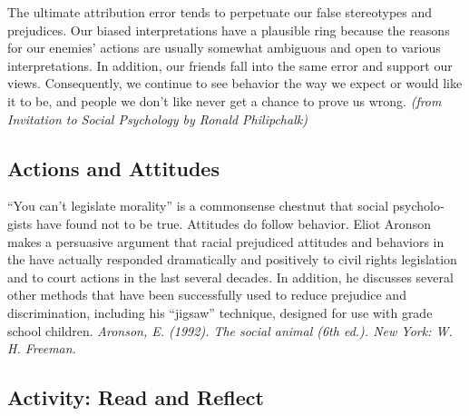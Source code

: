 \documentclass[
]{book}
\begin{document}
The ultimate attribution error tends to perpetuate our false stereotypes and prejudices. Our biased interpretations have a plausible ring because the reasons for our enemies' actions are usually somewhat ambiguous and open to various interpretations. In addition, our friends fall into the same error and support our views. Consequently, we continue to see behavior the way we expect or would like it to be, and people we don't like never get a chance to prove us wrong. \emph{(from Invitation to Social Psychology by Ronald Philipchalk)}

\hypertarget{actions-and-attitudes}{%
\subsection*{Actions and Attitudes}\label{actions-and-attitudes}}

``You can't legislate morality'' is a commonsense chestnut that social psycholo­gists have found not to be true. Attitudes do follow behavior. Eliot Aronson makes a persuasive argument that racial prejudiced attitudes and behaviors in the have actually responded dramatically and positively to civil rights legisla­tion and to court actions in the last several decades. In addition, he discusses sev­eral other methods that have been successfully used to reduce prejudice and discrimination, including his ``jigsaw'' technique, designed for use with grade school children. \emph{Aronson, E. (1992). The social animal (6th ed.). New York: W. H. Freeman.}

\hypertarget{activity-read-and-reflect-5}{%
\subsection*{Activity: Read and Reflect}\label{activity-read-and-reflect-5}}
\end{document}
